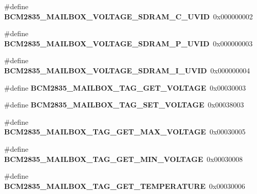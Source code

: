 \begin{DoxyCompactItemize}
\#define {\bfseries B\+C\+M2835\+\_\+\+M\+A\+I\+L\+B\+O\+X\+\_\+\+V\+O\+L\+T\+A\+G\+E\+\_\+\+S\+D\+R\+A\+M\+\_\+\+C\+\_\+\+U\+V\+ID}~0x000000002
\item 
\mbox{\label{group__raspberrypi__vc_ga6f9194f0d25467f87d45f8a7a29591fe}} 
\#define {\bfseries B\+C\+M2835\+\_\+\+M\+A\+I\+L\+B\+O\+X\+\_\+\+V\+O\+L\+T\+A\+G\+E\+\_\+\+S\+D\+R\+A\+M\+\_\+\+P\+\_\+\+U\+V\+ID}~0x000000003
\item 
\mbox{\label{group__raspberrypi__vc_ga18c38aa109c31c6b61514eddf80acc17}} 
\#define {\bfseries B\+C\+M2835\+\_\+\+M\+A\+I\+L\+B\+O\+X\+\_\+\+V\+O\+L\+T\+A\+G\+E\+\_\+\+S\+D\+R\+A\+M\+\_\+\+I\+\_\+\+U\+V\+ID}~0x000000004
\item 
\mbox{\label{group__raspberrypi__vc_ga9ff6f8e9fda3d37c744a889888c74b33}} 
\#define {\bfseries B\+C\+M2835\+\_\+\+M\+A\+I\+L\+B\+O\+X\+\_\+\+T\+A\+G\+\_\+\+G\+E\+T\+\_\+\+V\+O\+L\+T\+A\+GE}~0x00030003
\item 
\mbox{\label{group__raspberrypi__vc_ga3163f9cee8eafc4b16eed0fdd30c6ec1}} 
\#define {\bfseries B\+C\+M2835\+\_\+\+M\+A\+I\+L\+B\+O\+X\+\_\+\+T\+A\+G\+\_\+\+S\+E\+T\+\_\+\+V\+O\+L\+T\+A\+GE}~0x00038003
\item 
\mbox{\label{group__raspberrypi__vc_ga1659f19130e18fc4cc3d635671a88f0e}} 
\#define {\bfseries B\+C\+M2835\+\_\+\+M\+A\+I\+L\+B\+O\+X\+\_\+\+T\+A\+G\+\_\+\+G\+E\+T\+\_\+\+M\+A\+X\+\_\+\+V\+O\+L\+T\+A\+GE}~0x00030005
\item 
\mbox{\label{group__raspberrypi__vc_gae8a6ebd77732cf5c1fb0e02d554e9f7c}} 
\#define {\bfseries B\+C\+M2835\+\_\+\+M\+A\+I\+L\+B\+O\+X\+\_\+\+T\+A\+G\+\_\+\+G\+E\+T\+\_\+\+M\+I\+N\+\_\+\+V\+O\+L\+T\+A\+GE}~0x00030008
\item 
\mbox{\label{group__raspberrypi__vc_ga88568bde440110d1b4e791aede294daf}} 
\#define {\bfseries B\+C\+M2835\+\_\+\+M\+A\+I\+L\+B\+O\+X\+\_\+\+T\+A\+G\+\_\+\+G\+E\+T\+\_\+\+T\+E\+M\+P\+E\+R\+A\+T\+U\+RE}~0x00030006
\item 
\mbox{\label{group__raspberrypi__vc_ga5df657d2bb4897782660a429ef7af688}} 

\end{DoxyCompactItemize}
